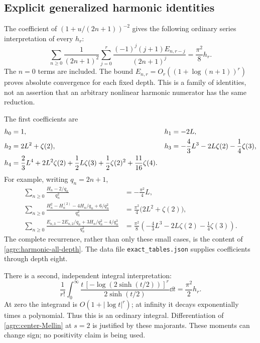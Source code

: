 \subsection{Explicit generalized harmonic identities}

The coefficient of $(1+u/(2n+1))^{-2}$ gives the following ordinary
series interpretation of every $h_r$:
\begin{equation}\label{agrc:harmonic-all-depth}
 \boxed{\displaystyle
 \sum_{n\geq0}\frac1{(2n+1)^2}
    \sum_{j=0}^r\frac{(-1)^j(j+1)E_{n,r-j}}{(2n+1)^j}
       =\frac{\pi^2}{8}h_r.}
\end{equation}
The $n=0$ terms are included. The bound
$E_{n,r}=O_r((1+\log(n+1))^r)$ proves absolute convergence for each
fixed depth. This is a family of identities, not an assertion that an
arbitrary nonlinear harmonic numerator has the same reduction.

The first coefficients are
\begin{align}
 h_0&=1,&h_1&=-2L,\notag\\
 h_2&=2L^2+\zeta(2),&
 h_3&=-\frac43L^3-2L\zeta(2)-\frac14\zeta(3),\notag\\
 h_4&=\frac23L^4+2L^2\zeta(2)+\frac12L\zeta(3)
                       +\frac12\zeta(2)^2+\frac{11}{16}\zeta(4).
 \label{agrc:h-examples}
\end{align}
For example, writing $q_n=2n+1$,
\begin{align}
 \sum_{n\geq0}\frac{H_n-2/q_n}{q_n^2}
   &=-\frac{\pi^2}{4}L,\label{agrc:h-linear}\\
 \sum_{n\geq0}\frac{H_n^2-H_n^{(2)}-4H_n/q_n+6/q_n^2}{q_n^2}
   &=\frac{\pi^2}{4}\bigl(2L^2+\zeta(2)\bigr),
 \label{agrc:h-quadratic}\\
 \sum_{n\geq0}\frac{E_{n,3}-2E_{n,2}/q_n+3H_n/q_n^2-4/q_n^3}{q_n^2}
   &=\frac{\pi^2}{8}\left(-\frac43L^3-2L\zeta(2)-\frac14\zeta(3)\right).
 \label{agrc:h-cubic}
\end{align}
The complete recurrence, rather than only these small cases, is the
content of \eqref{agrc:harmonic-all-depth}. The data file
\texttt{exact\_tables.json} supplies coefficients through depth eight.

There is a second, independent integral interpretation:
\begin{equation}\label{agrc:log-sinh-moments}
 \frac1{r!}\int_0^\infty
 \frac{t\,[-\log(2\sinh(t/2))]^r}{2\sinh(t/2)}\dd t
     =\frac{\pi^2}{2}h_r.
\end{equation}
At zero the integrand is $O(1+|\log t|^r)$; at infinity it decays
exponentially times a polynomial. Thus this is an ordinary integral.
Differentiation of \eqref{agrc:center-Mellin} at $s=2$ is justified
by these majorants. These moments can change sign; no positivity claim
is being used.

